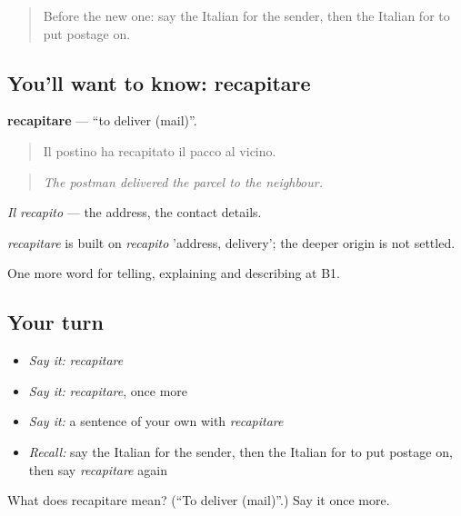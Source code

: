 \label{lesson:IT-C458-recapitare}



\begin{quote}
Before the new one: say the Italian for the sender, then the Italian for to put postage on.
\end{quote}

\subsection*{You'll want to know: recapitare}
\textbf{recapitare} — \textquotedblleft{}to deliver (mail)\textquotedblright{}.

\begin{quote}
Il postino ha recapitato il pacco al vicino.
\end{quote}

\begin{quote}
\emph{The postman delivered the parcel to the neighbour.}
\end{quote}

\emph{Il recapito} — the address, the contact details.

\begin{cousinweb}
\emph{recapitare} is built on \emph{recapito} 'address, delivery'; the deeper origin is not settled.
\end{cousinweb}

\begin{grammarlens}[title={What you've built}]
One more word for telling, explaining and describing at B1.
\end{grammarlens}

\subsection*{Your turn}
\begin{itemize}
\raggedright
  \item \emph{Say it:} \emph{recapitare}
  \item \emph{Say it:} \emph{recapitare}, once more
  \item \emph{Say it:} a sentence of your own with \emph{recapitare}
  \item \emph{Recall:} say the Italian for the sender, then the Italian for to put postage on, then say \emph{recapitare} again
\end{itemize}

\begin{tcolorbox}[breakable,colback=teal!4,colframe=teal!35!black,title={Before you move on}]
What does recapitare mean? (\textquotedblleft{}To deliver (mail)\textquotedblright{}.) Say it once more.
\end{tcolorbox}
